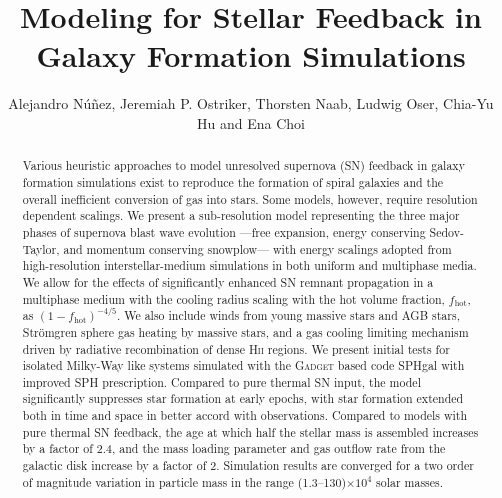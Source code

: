 \documentclass[iop]{emulateapj}
\begin{document}
\title{Modeling for Stellar Feedback in Galaxy Formation Simulations}
\author{Alejandro N\'u\~nez, Jeremiah P. Ostriker, Thorsten Naab, Ludwig Oser, Chia-Yu Hu and Ena Choi}


\begin{abstract}
Various heuristic approaches to model unresolved supernova (SN) feedback in galaxy formation simulations exist to reproduce the formation of spiral galaxies and the overall inefficient conversion of gas into stars. Some models, however, require resolution dependent scalings. We present a sub-resolution model representing the three major phases of supernova blast wave evolution ---free expansion, energy conserving Sedov-Taylor, and momentum conserving snowplow--- with energy scalings adopted from high-resolution interstellar-medium simulations in both uniform and multiphase media. We allow for the effects of significantly enhanced SN remnant propagation in a multiphase medium with the cooling radius scaling with the hot volume fraction, $f_{\mathrm{hot}}$, as $(1 - f_{\mathrm{hot}})^{-4/5}$. We also include winds from young massive stars and AGB stars, Str\"omgren sphere gas heating by massive stars, and a gas cooling limiting mechanism driven by radiative recombination of dense H\textsc{ii} regions. We present initial tests for isolated Milky-Way like systems simulated with the \textsc{Gadget} based code SPHgal with improved SPH prescription. Compared to pure thermal SN input, the model significantly suppresses star formation at early epochs, with star formation extended both in time and space in better accord with observations. Compared to models with pure thermal SN feedback, the age at which half the stellar mass is assembled increases by a factor of 2.4, and the mass loading parameter and gas outflow rate from the galactic disk increase by a factor of 2. Simulation results are converged for a two order of magnitude variation in particle mass in the range (1.3--130)$\times 10^4$ solar masses. 
\end{abstract}
\end{document}
